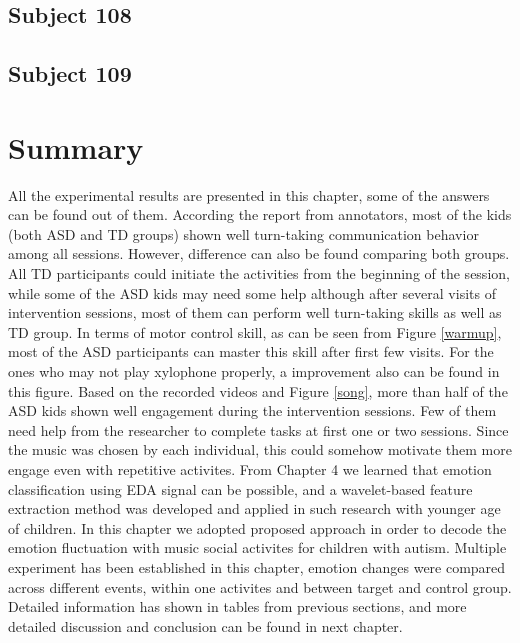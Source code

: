 \subsection{Subject 108}
\subsection{Subject 109}

\section{Summary}
All the experimental results are presented in this chapter, some of the answers can be found out
of them. According the report from annotators, most of the kids (both ASD and TD groups) shown 
well turn-taking communication behavior among all sessions. However, difference can also be found
comparing both groups. All TD participants could initiate the activities from the beginning of the
session, while some of the ASD kids may need some help although after several visits of intervention
sessions, most of them can perform well turn-taking skills as well as TD group. In terms of motor 
control skill, as can be seen from Figure \ref{warmup}, most of the ASD participants
can master this skill after first few visits. For the ones who may not play xylophone properly, a improvement
also can be found in this figure. Based on the recorded videos and Figure \ref{song}, 
more than half of the ASD kids shown well engagement during the intervention sessions. 
Few of them need help from the researcher to complete tasks at first
one or two sessions. Since the music was chosen by each individual, this could somehow motivate them
more engage even with repetitive activites. From Chapter 4 we learned that emotion classification 
using EDA signal can be possible, and a wavelet-based feature extraction method was developed and 
applied in such research with younger age of children. In this chapter we adopted proposed approach 
in order to decode the emotion fluctuation with music social activites for children with autism.
Multiple experiment has been established in this chapter, emotion changes were compared across different
events, within one activites and between target and control group. Detailed information has shown
in tables from previous sections, and more detailed discussion and conclusion can be found in next
chapter.